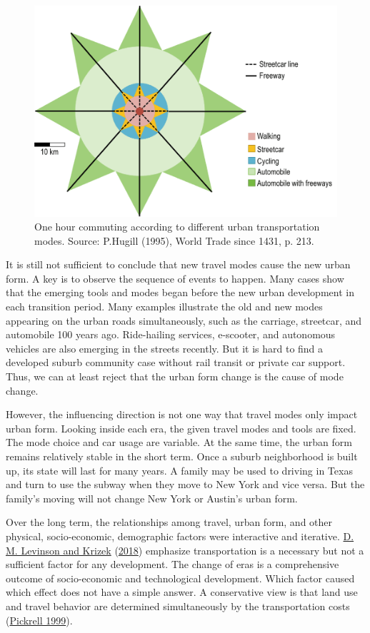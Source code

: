\documentclass[
  12pt,
]{article}
\begin{document}
\begin{figure}

{\centering \includegraphics[width=0.5\linewidth]{fig/one_hour_commmuting2} 

}

\caption{One hour commuting according to different urban transportation modes. Source: P.Hugill (1995), World Trade since 1431, p. 213.}\label{fig:4age}
\end{figure}

It is still not sufficient to conclude that new travel modes cause the new urban form. A key is to observe the sequence of events to happen. Many cases show that the emerging tools and modes began before the new urban development in each transition period. Many examples illustrate the old and new modes appearing on the urban roads simultaneously, such as the carriage, streetcar, and automobile 100 years ago. Ride-hailing services, e-scooter, and autonomous vehicles are also emerging in the streets recently. But it is hard to find a developed suburb community case without rail transit or private car support. Thus, we can at least reject that the urban form change is the cause of mode change.

However, the influencing direction is not one way that travel modes only impact urban form. Looking inside each era, the given travel modes and tools are fixed. The mode choice and car usage are variable. At the same time, the urban form remains relatively stable in the short term. Once a suburb neighborhood is built up, its state will last for many years. A family may be used to driving in Texas and turn to use the subway when they move to New York and vice versa. But the family's moving will not change New York or Austin's urban form.

Over the long term, the relationships among travel, urban form, and other physical, socio-economic, demographic factors were interactive and iterative. \protect\hyperlink{ref-levinsonMetropolitanTransportLand2018}{D. M. Levinson and Krizek} (\protect\hyperlink{ref-levinsonMetropolitanTransportLand2018}{2018}) emphasize transportation is a necessary but not a sufficient factor for any development. The change of eras is a comprehensive outcome of socio-economic and technological development. Which factor caused which effect does not have a simple answer. A conservative view is that land use and travel behavior are determined simultaneously by the transportation costs (\protect\hyperlink{ref-pickrellTRANSPORTATIONLANDUSE1999}{Pickrell 1999}).
\end{document}
